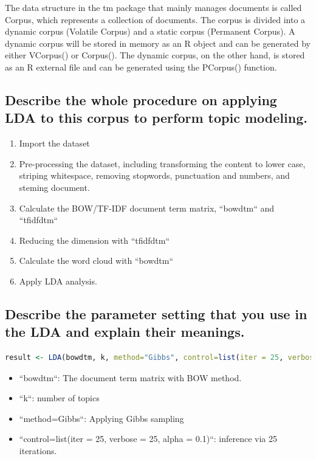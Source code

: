 \documentclass{article}
\begin{document}
The data structure in the tm package that mainly manages documents is called Corpus, which represents a collection of documents. The corpus is divided into a dynamic corpus (Volatile Corpus) and a static corpus (Permanent Corpus). A dynamic corpus will be stored in memory as an R object and can be generated by either VCorpus() or Corpus(). The dynamic corpus, on the other hand, is stored as an R external file and can be generated using the PCorpus() function.

\subsection{Describe the whole procedure on applying LDA to this corpus to perform topic modeling.}
\begin{enumerate}
  \item Import the dataset
  \item Pre-processing the dataset, including transforming the content to lower case, striping whitespace, removing stopwords, punctuation and numbers, and steming document. 
  \item Calculate the BOW/TF-IDF document term matrix, ``bowdtm`` and ``tfidfdtm``
  \item Reducing the dimension with ``tfidfdtm``
  \item Calculate the word cloud with ``bowdtm``
  \item Apply LDA analysis.
\end{enumerate}

\subsection{Describe the parameter setting that you use in the LDA and explain their meanings.}
\begin{lstlisting}[language=R]
 result <- LDA(bowdtm, k, method="Gibbs", control=list(iter = 25, verbose = 25, alpha = 0.1))
\end{lstlisting}

\begin{itemize}
  \item ``bowdtm``: The document term matrix with BOW method.
  \item ``k``: number of topics
  \item ``method=Gibbs``: Applying Gibbs sampling
  \item ``control=list(iter = 25, verbose = 25, alpha = 0.1)``: inference via 25 iterations.
\end{itemize}
\end{document}
